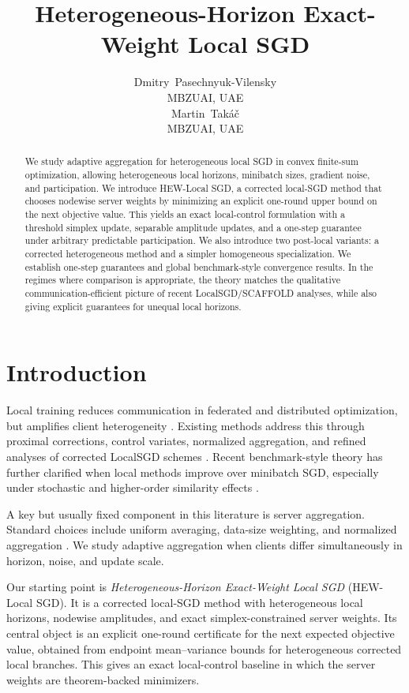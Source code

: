 \documentclass{article}
\title{Heterogeneous-Horizon Exact-Weight Local SGD}
\author{Dmitry~Pasechnyuk-Vilensky \\ MBZUAI, UAE \\
\And
Martin~Tak\'a\v{c}  \\ MBZUAI, UAE
}
\theoremstyle{definition}
\begin{document}
\maketitle

\begin{abstract}
We study adaptive aggregation for heterogeneous local SGD in convex finite-sum optimization, allowing heterogeneous local horizons, minibatch sizes, gradient noise, and participation. We introduce HEW-Local SGD, a corrected local-SGD method that chooses nodewise server weights by minimizing an explicit one-round upper bound on the next objective value. This yields an exact local-control formulation with a threshold simplex update, separable amplitude updates, and a one-step guarantee under arbitrary predictable participation. We also introduce two post-local variants: a corrected heterogeneous method and a simpler homogeneous specialization. We establish one-step guarantees and global benchmark-style convergence results. In the regimes where comparison is appropriate, the theory matches the qualitative communication-efficient picture of recent LocalSGD/SCAFFOLD analyses, while also giving explicit guarantees for unequal local horizons.
\end{abstract}
\section{Introduction}

Local training reduces communication in federated and distributed optimization, but amplifies client heterogeneity \citep{gorbunov2021local,karimireddy2020scaffold,li2020federated,mcmahan2017communication,wang2020tackling}. Existing methods address this through proximal corrections, control variates, normalized aggregation, and refined analyses of corrected LocalSGD schemes \citep{gorbunov2021local,karimireddy2020scaffold,li2020federated,wang2020tackling}. Recent benchmark-style theory has further clarified when local methods improve over minibatch SGD, especially under stochastic and higher-order similarity effects \citep{luo2025revisiting,mangold2025scaffold}.

A key but usually fixed component in this literature is server aggregation. Standard choices include uniform averaging, data-size weighting, and normalized aggregation \citep{mcmahan2017communication,wang2020tackling}. We study adaptive aggregation when clients differ simultaneously in horizon, noise, and update scale.

Our starting point is \emph{Heterogeneous-Horizon Exact-Weight Local SGD} (HEW-Local SGD). It is a corrected local-SGD method with heterogeneous local horizons, nodewise amplitudes, and exact simplex-constrained server weights. Its central object is an explicit one-round certificate for the next expected objective value, obtained from endpoint mean--variance bounds for heterogeneous corrected local branches. This gives an exact local-control baseline in which the server weights are theorem-backed minimizers.
\end{document}
